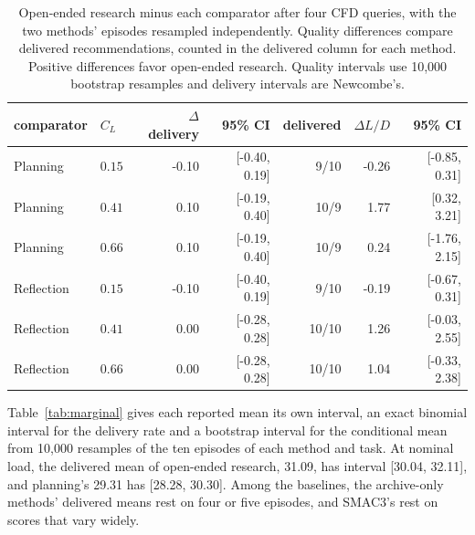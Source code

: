 \documentclass{article} %
\begin{document}
\begin{table}[h]
\caption{Open-ended research minus each comparator after four CFD queries,
with the two methods' episodes resampled independently. Quality differences
compare delivered recommendations, counted in the delivered column for each
method. Positive differences favor open-ended research. Quality intervals use
10{,}000 bootstrap resamples and delivery intervals are Newcombe's.}
\label{tab:agent-contrasts}
\centering
\scriptsize
\setlength{\tabcolsep}{3pt}
\begin{tabular*}{\textwidth}{@{\extracolsep{\fill}}llrrrrr}
\toprule
comparator & $C_L$ & $\Delta$ delivery & 95\% CI & delivered & $\Delta L/D$ & 95\% CI \\
\midrule
Planning & $0.15$ & -0.10 & [-0.40, 0.19] & 9/10 & -0.26 & [-0.85, 0.31] \\
Planning & $0.41$ & 0.10 & [-0.19, 0.40] & 10/9 & 1.77 & [0.32, 3.21] \\
Planning & $0.66$ & 0.10 & [-0.19, 0.40] & 10/9 & 0.24 & [-1.76, 2.15] \\
Reflection & $0.15$ & -0.10 & [-0.40, 0.19] & 9/10 & -0.19 & [-0.67, 0.31] \\
Reflection & $0.41$ & 0.00 & [-0.28, 0.28] & 10/10 & 1.26 & [-0.03, 2.55] \\
Reflection & $0.66$ & 0.00 & [-0.28, 0.28] & 10/10 & 1.04 & [-0.33, 2.38] \\
\bottomrule
\end{tabular*}
\end{table}

Table~\ref{tab:marginal} gives each reported mean its own interval, an exact
binomial interval for the delivery rate and a bootstrap interval for the
conditional mean from 10{,}000 resamples of the ten episodes of each method and task.
At nominal load, the delivered mean of open-ended research, 31.09, has interval
[30.04, 32.11], and planning's 29.31 has [28.28, 30.30]. Among the baselines,
the archive-only methods' delivered means rest on four or five episodes, and
SMAC3's rest on scores that vary widely.
\end{document}
